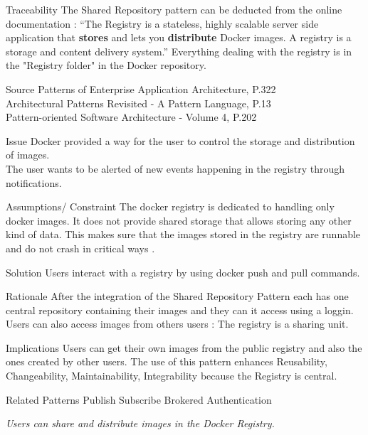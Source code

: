 \begin{patdescription}
\item[Traceability]
The Shared Repository pattern can be deducted from the online documentation : \cite{dockregistry} ``The Registry is a stateless, highly scalable server side application that \textbf{stores} and lets you \textbf{distribute} Docker images. A registry is a storage and content delivery system.''
Everything dealing with the registry is in the "Registry folder" in the Docker repository.


\item[Source]
Patterns of Enterprise Application Architecture, P.322 \cite{eaa}\\
Architectural Patterns Revisited - A Pattern Language, P.13 \cite{avgeriou2005architectural}\\
Pattern-oriented Software Architecture - Volume 4, P.202 \cite{wiley4}

\item[Issue]
Docker provided a way for the user to control the storage and distribution of images. \\
The user wants to be alerted of new events happening in the registry through notifications. %

\item[Assumptions/ Constraint]
The docker registry is dedicated to handling only docker images. It does not provide shared storage that allows storing any other kind of data. This makes sure that the images stored in the registry are runnable and do not crash in critical ways .


\item[Solution] %
Users interact with a registry by using docker push and pull commands. %

\item[Rationale] %
 After the integration of the Shared Repository Pattern each has one central repository containing their images and they can it access using a loggin.
 Users can also access images from others users : The registry is a sharing unit. \\
 
 \item [Implications]
Users can get their own images from the public registry and also the ones created by other users. %
The use of this pattern enhances Reusability, Changeability, Maintainability, Integrability because the Registry is central.

\item [Related Patterns]
Publish Subscribe 
Brokered Authentication

\textit{Users can share and distribute images in the Docker Registry.}
 
\end{patdescription}


